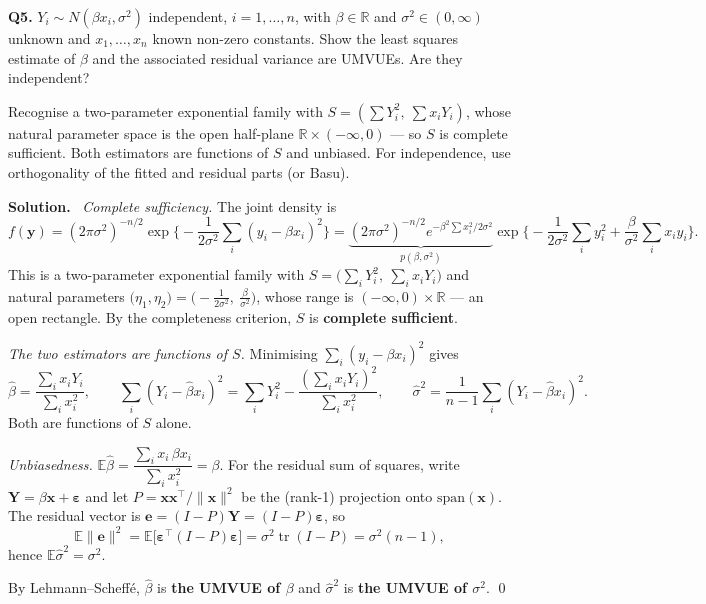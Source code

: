 \documentclass[11pt]{article}
\newcommand{\E}{\mathbb{E}}
\newcommand{\R}{\mathbb{R}}
\newenvironment{prob}[1]{\medskip\noindent\textbf{\large #1}\quad}{\par}
\newcommand{\soln}{\medskip\noindent\textbf{Solution.}\ }
\begin{document}
\bigskip
\begin{prob}{Q5.}
$Y_i\sim N(\beta x_i,\sigma^2)$ independent, $i=1,\dots,n$, with $\beta\in\R$ and
$\sigma^2\in(0,\infty)$ unknown and $x_1,\dots,x_n$ known non-zero constants. Show the least
squares estimate of $\beta$ and the associated residual variance are UMVUEs. Are they
independent?
\end{prob}

\begin{ideabox}
Recognise a two-parameter exponential family with $S=(\sum Y_i^2,\ \sum x_iY_i)$, whose natural
parameter space is the open half-plane $\R\times(-\infty,0)$ --- so $S$ is complete sufficient.
Both estimators are functions of $S$ and unbiased. For independence, use orthogonality of the
fitted and residual parts (or Basu).
\end{ideabox}

\soln
\emph{Complete sufficiency.} The joint density is
\[
f(\mathbf{y})=(2\pi\sigma^2)^{-n/2}\exp\Big\{-\frac{1}{2\sigma^2}\sum_i(y_i-\beta x_i)^2\Big\}
=\underbrace{(2\pi\sigma^2)^{-n/2}e^{-\beta^2\sum x_i^2/2\sigma^2}}_{p(\beta,\sigma^2)}
\exp\Big\{-\frac{1}{2\sigma^2}\sum_iy_i^2+\frac{\beta}{\sigma^2}\sum_ix_iy_i\Big\}.
\]
This is a two-parameter exponential family with
$S=\big(\sum_iY_i^2,\ \sum_ix_iY_i\big)$ and natural parameters
$\big(\eta_1,\eta_2\big)=\big(-\tfrac{1}{2\sigma^2},\ \tfrac{\beta}{\sigma^2}\big)$,
whose range is $(-\infty,0)\times\R$ --- an open rectangle. By the completeness criterion,
$S$ is \textbf{complete sufficient}.

\emph{The two estimators are functions of $S$.} Minimising $\sum_i(y_i-\beta x_i)^2$ gives
\[
\hat\beta=\frac{\sum_i x_iY_i}{\sum_i x_i^2},\qquad
\sum_i(Y_i-\hat\beta x_i)^2=\sum_iY_i^2-\frac{(\sum_ix_iY_i)^2}{\sum_ix_i^2},\qquad
\hat\sigma^2=\frac{1}{n-1}\sum_i(Y_i-\hat\beta x_i)^2 .
\]
Both are functions of $S$ alone.

\emph{Unbiasedness.} $\E\hat\beta=\dfrac{\sum_ix_i\,\beta x_i}{\sum_ix_i^2}=\beta$. For the
residual sum of squares, write $\mathbf{Y}=\beta\mathbf{x}+\boldsymbol\varepsilon$ and let
$P=\mathbf{x}\mathbf{x}^{\!\top}\!/\|\mathbf{x}\|^2$ be the (rank-1) projection onto
$\mathrm{span}(\mathbf{x})$. The residual vector is
$\mathbf{e}=(I-P)\mathbf{Y}=(I-P)\boldsymbol\varepsilon$, so
\[
\E\|\mathbf{e}\|^2=\E\big[\boldsymbol\varepsilon^{\!\top}(I-P)\boldsymbol\varepsilon\big]
=\sigma^2\operatorname{tr}(I-P)=\sigma^2(n-1),
\]
hence $\E\hat\sigma^2=\sigma^2$.

By Lehmann--Scheff\'e, $\hat\beta$ is \textbf{the UMVUE of $\beta$} and $\hat\sigma^2$ is
\textbf{the UMVUE of $\sigma^2$}. \qed
\end{document}
